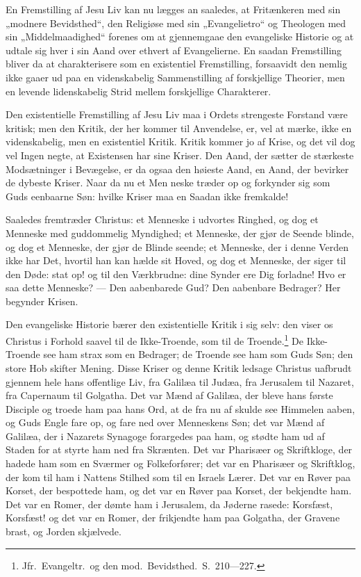 \documentclass[12pt,a4paper]{book}
\newcommand{\opage}[1]{\marginnote{\footnotesize\textit{[#1]}}}
\begin{document}
En Fremstilling af Jesu Liv kan nu lægges an saaledes, at Fritænkeren med
sin „modnere Bevidsthed“, den Religiøse med sin „Evangelietro“ og
Theologen med sin „Middelmaadighed“ forenes om at gjennemgaae den
evangeliske Historie og at udtale sig hver i sin Aand over ethvert af
Evangelierne. En saadan Fremstilling bliver da at charakterisere som en
existentiel Fremstilling, forsaavidt den nemlig ikke gaaer ud paa en
videnskabelig Sammenstilling af forskjellige Theorier, men en levende
lidenskabelig Strid mellem forskjellige Charakterer.

Den existentielle Fremstilling af Jesu Liv maa i Ordets strengeste
Forstand være kritisk; men den Kritik, der her kommer til Anvendelse, er,
vel at mærke, ikke en videnskabelig, men en existentiel Kritik. Kritik
kommer jo af Krise, og det vil dog vel Ingen negte, at Existensen har
sine Kriser. Den Aand, der sætter de stærkeste Modsætninger i Bevægelse,
er da ogsaa den høieste Aand, en Aand, der bevirker de dybeste Kriser.
Naar da nu et Men%
\opage{92}neske træder op og forkynder sig som Guds eenbaarne Søn: hvilke Kriser
maa en Saadan ikke fremkalde!

Saaledes fremtræder Christus: et Menneske i udvortes Ringhed, og dog et
Menneske med guddommelig Myndighed; et Menneske, der gjør de Seende
blinde, og dog et Menneske, der gjør de Blinde seende; et Menneske, der i
denne Verden ikke har Det, hvortil han kan hælde sit Hoved, og dog et
Menneske, der siger til den Døde: stat op! og til den Værkbrudne: dine
Synder ere Dig forladne! Hvo er saa dette Menneske? --- Den aabenbarede
Gud? Den aabenbare Bedrager? Her begynder Krisen.

Den evangeliske Historie bærer den existentielle Kritik i sig selv: den
viser os Christus i Forhold saavel til de Ikke-Troende, som til de
Troende.\footnote{Jfr.\ Evangeltr.\ og den mod.\ Bevidsthed.\ S.\
210---227.} De Ikke-Troende see ham strax som en Bedrager; de Troende see
ham som Guds Søn; den store Hob skifter Mening. Disse Kriser og denne
Kritik ledsage Christus uafbrudt gjennem hele hans offentlige Liv, fra
Galilæa til Judæa, fra Jerusalem til Nazaret, fra Capernaum til Golgatha.
Det var Mænd af Galilæa, der bleve hans første Disciple og troede ham paa
hans Ord, at de fra nu af skulde see Himmelen aaben, og Guds Engle fare
op, og fare ned over Menneskens Søn; det var Mænd af Galilæa, der i
Nazarets Synagoge forargedes paa ham, og stødte ham ud af Staden for at
styrte ham ned fra Skrænten. Det var Pharisæer og Skriftkloge, der
hadede ham som en Sværmer og Folkeforfører; det var en Pharisæer og
Skriftklog, der kom til ham i Nattens Stilhed som til en Israels Lærer.
Det var en Røver paa Korset, der bespottede ham, og det var en Røver paa
Korset, der bekjendte ham. Det var en Romer, der dømte ham i Jerusalem,
da Jøderne rasede: Korsfæst, Korsfæst! og det var en Romer, der
frikjendte ham paa Golgatha, der Gravene brast, og Jorden skjælvede.
\end{document}

